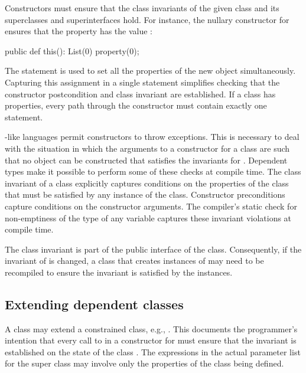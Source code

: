 Constructors must ensure that the class invariants of the given
class and its superclasses and superinterfaces hold.
For instance, the
nullary constructor for  ensures that the property
 has the value :
\begin{xtennoindent}
  public def this(): List(0) { property(0); }
\end{xtennoindent}
The  statement is used to set all the properties
of the new object simultaneously.  Capturing this assignment in
a single statement simplifies checking that the constructor
postcondition and class invariant are established.  If a class
has properties, every path through the constructor must contain
exactly one  statement.

\java{}-like languages permit constructors to throw exceptions. This
is necessary to deal with the situation in which the arguments to a
constructor for a class  are such that no object can be
constructed that satisfies the invariants for . Dependent
types make it possible to perform some of these checks at
compile time. The class invariant of a class explicitly captures
conditions on the properties of the class that must be satisfied by
any instance of the class.  Constructor preconditions capture
conditions on the constructor arguments.
The compiler's static check for
non-emptiness of the type of any variable captures these invariant
violations at compile time.

The class invariant is part of the public interface of the
class.  Consequently, if the invariant of  is changed, a class
that creates instances of 
may need to be recompiled to ensure the invariant is satisfied
by the instances.



\subsection{Extending dependent classes}

A class may extend a constrained class, e.g.,
   .
This documents the programmer's intention that
every call to  in a constructor for  must ensure
that the invariant  is established on the state of the class
. The expressions in the actual parameter list for the super
class may involve only the properties of the class being defined.

